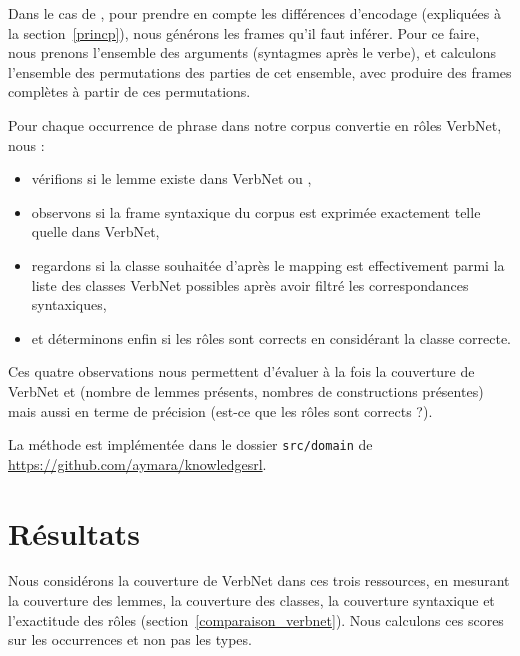 Dans le cas de \verbenet{}, pour prendre en compte les différences d'encodage
(expliquées à la section~\ref{princp}), nous générons les frames qu'il faut
inférer. Pour ce faire, nous prenons l'ensemble des arguments (syntagmes après
le verbe), et calculons l'ensemble des permutations des parties de cet
ensemble, avec produire des frames complètes à partir de ces permutations.

Pour chaque occurrence de phrase dans notre corpus convertie en rôles VerbNet,
nous :
\begin{itemize}
    \item vérifions si le lemme existe dans VerbNet ou \verbenet{},
    \item observons si la frame syntaxique du corpus est exprimée exactement
        telle quelle dans VerbNet,
    \item regardons si la classe souhaitée d'après le mapping est effectivement
        parmi la liste des classes VerbNet possibles après avoir filtré les
        correspondances syntaxiques,
    \item et déterminons enfin si les rôles sont corrects en considérant la
        classe correcte.
\end{itemize}

Ces quatre observations nous permettent d'évaluer à la fois la couverture de
VerbNet et \verbenet{} (nombre de lemmes présents, nombres de constructions
présentes) mais aussi en terme de précision (est-ce que les rôles sont corrects
?).

La méthode est implémentée dans le dossier \texttt{src/domain} de
\url{https://github.com/aymara/knowledgesrl}.

\section{Résultats}
\label{sec:domainsrlresults}

Nous considérons la couverture de VerbNet dans ces trois ressources, en
mesurant la couverture des lemmes, la couverture des classes, la couverture
syntaxique et l'exactitude des rôles (section~\ref{comparaison_verbnet}). Nous
calculons ces scores sur les occurrences et non pas les types.

